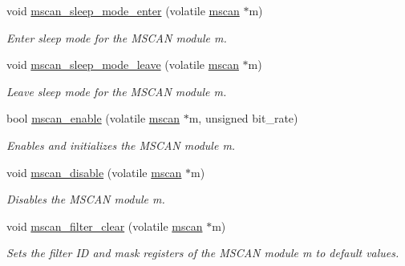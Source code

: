 \begin{DoxyCompactItemize}
void \mbox{\hyperlink{group__RTEMSBSPsPowerPCGen5200MSCAN_gad83ce6a322af397faaf49fa15e2b5796}{mscan\+\_\+sleep\+\_\+mode\+\_\+enter}} (volatile \mbox{\hyperlink{group__RTEMSBSPsPowerPCGen5200MSCAN_gacfd56a4a482c5e7da2cff003284b2d51}{mscan}} $\ast$m)
\begin{DoxyCompactList}\small\item\em Enter sleep mode for the M\+S\+C\+AN module {\itshape m}. \end{DoxyCompactList}\item 
void \mbox{\hyperlink{group__RTEMSBSPsPowerPCGen5200MSCAN_ga189ba2bd33b05769166ff5c105af3395}{mscan\+\_\+sleep\+\_\+mode\+\_\+leave}} (volatile \mbox{\hyperlink{group__RTEMSBSPsPowerPCGen5200MSCAN_gacfd56a4a482c5e7da2cff003284b2d51}{mscan}} $\ast$m)
\begin{DoxyCompactList}\small\item\em Leave sleep mode for the M\+S\+C\+AN module {\itshape m}. \end{DoxyCompactList}\item 
bool \mbox{\hyperlink{group__RTEMSBSPsPowerPCGen5200MSCAN_ga8b80a3020d69fd2993928c0aae87b068}{mscan\+\_\+enable}} (volatile \mbox{\hyperlink{group__RTEMSBSPsPowerPCGen5200MSCAN_gacfd56a4a482c5e7da2cff003284b2d51}{mscan}} $\ast$m, unsigned bit\+\_\+rate)
\begin{DoxyCompactList}\small\item\em Enables and initializes the M\+S\+C\+AN module {\itshape m}. \end{DoxyCompactList}\item 
void \mbox{\hyperlink{group__RTEMSBSPsPowerPCGen5200MSCAN_gad8c8f94ea2a29e3052664a870319cbec}{mscan\+\_\+disable}} (volatile \mbox{\hyperlink{group__RTEMSBSPsPowerPCGen5200MSCAN_gacfd56a4a482c5e7da2cff003284b2d51}{mscan}} $\ast$m)
\begin{DoxyCompactList}\small\item\em Disables the M\+S\+C\+AN module {\itshape m}. \end{DoxyCompactList}\item 
void \mbox{\hyperlink{group__RTEMSBSPsPowerPCGen5200MSCAN_gaea10ec6ee1163bdb33ff13b21332dfd7}{mscan\+\_\+filter\+\_\+clear}} (volatile \mbox{\hyperlink{group__RTEMSBSPsPowerPCGen5200MSCAN_gacfd56a4a482c5e7da2cff003284b2d51}{mscan}} $\ast$m)
\begin{DoxyCompactList}\small\item\em Sets the filter ID and mask registers of the M\+S\+C\+AN module {\itshape m} to default values. \end{DoxyCompactList}\item 

\end{DoxyCompactItemize}
